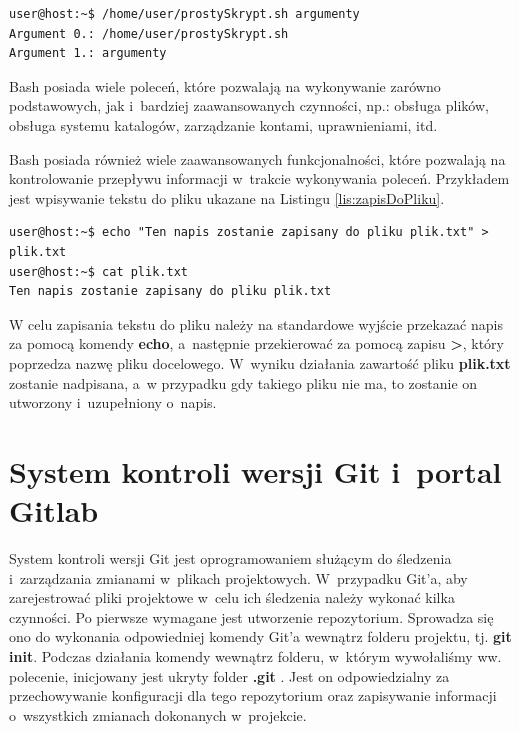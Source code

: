 \begin{lstlisting}[language=bash,language=Cmd,caption={Przykład działania Skryptu z~Listingu \ref{lst:prostySkrypt}}]
user@host:~$ /home/user/prostySkrypt.sh argumenty
Argument 0.: /home/user/prostySkrypt.sh
Argument 1.: argumenty
\end{lstlisting}

Bash posiada wiele poleceń, które pozwalają na wykonywanie zarówno podstawowych, jak i~bardziej zaawansowanych czynności, np.: obsługa plików, obsługa systemu katalogów, zarządzanie kontami, uprawnieniami, itd.


Bash posiada również wiele zaawansowanych funkcjonalności, które pozwalają na kontrolowanie przepływu informacji w~trakcie wykonywania poleceń. Przykładem jest wpisywanie tekstu do pliku ukazane na Listingu \ref{lis:zapisDoPliku}.

\begin{lstlisting}[label={lis:zapisDoPliku},language=Cmd,caption={Przykład zapisu tekstu do pliku}]
user@host:~$ echo "Ten napis zostanie zapisany do pliku plik.txt" > plik.txt
user@host:~$ cat plik.txt
Ten napis zostanie zapisany do pliku plik.txt
\end{lstlisting}

W celu zapisania tekstu do pliku należy na standardowe wyjście przekazać napis za pomocą komendy \textbf{echo}, a~następnie przekierować za pomocą zapisu \textbf{>}, który poprzedza nazwę pliku docelowego. W~wyniku działania zawartość pliku \textbf{plik.txt} zostanie nadpisana, a~w przypadku gdy takiego pliku nie ma, to zostanie on utworzony i~uzupełniony o~napis.\par


\section{System kontroli wersji Git i~portal Gitlab}
System kontroli wersji Git jest oprogramowaniem służącym do śledzenia i~zarządzania zmianami w~plikach projektowych. W~przypadku Git'a, aby zarejestrować pliki projektowe w~celu ich śledzenia należy wykonać kilka czynności. Po pierwsze wymagane jest utworzenie repozytorium. Sprowadza się ono do wykonania odpowiedniej komendy Git'a wewnątrz folderu projektu, tj. \textbf{git init}. Podczas działania komendy wewnątrz folderu, w~którym wywołaliśmy ww. polecenie, inicjowany jest ukryty folder \textbf{.git}
. Jest on odpowiedzialny za przechowywanie konfiguracji dla tego repozytorium oraz zapisywanie informacji o~wszystkich zmianach dokonanych w~projekcie.

